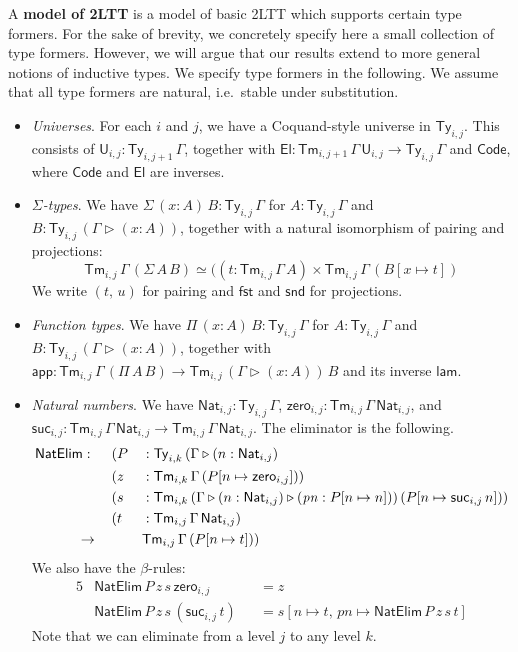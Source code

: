 \documentclass[acmsmall]{acmart}
\newcommand{\mit}[1]{\mathit{#1}}
\newcommand{\msf}[1]{\mathsf{#1}}
\newcommand{\ext}{\triangleright}
\newcommand{\Code}{\msf{Code}}
\newcommand{\El}{\msf{El}}
\newcommand{\lam}{\msf{lam}}
\newcommand{\app}{\msf{app}}
\newcommand{\NatElim}{\msf{NatElim}}
\renewcommand{\U}{\msf{U}}
\newcommand{\Ty}{\msf{Ty}}
\newcommand{\Tm}{\msf{Tm}}
\newcommand{\Nat}{\msf{Nat}}
\newcommand{\zero}{\msf{zero}}
\newcommand{\suc}{\msf{suc}}
\newcommand{\fst}{\msf{fst}}
\newcommand{\snd}{\msf{snd}}
\theoremstyle{remark}
\begin{document}
\begin{definition} A \textbf{model of 2LTT} is a model of basic 2LTT
which supports certain type formers. For the sake of brevity, we concretely
specify here a small collection of type formers. However, we will argue that our
results extend to more general notions of inductive types. We specify type
formers in the following. We assume that all type formers are natural,
i.e.\ stable under substitution.
\begin{itemize}
\item \emph{Universes}. For each $i$ and $j$, we have a Coquand-style universe
  \cite{TODO} in $\Ty_{i,j}$. This consists of $\U_{i,j} : \Ty_{i,j+1}\,\Gamma$,
  together with $\El : \Tm_{i,j+1}\,\Gamma\,\U_{i,j} \to \Ty_{i,j}\,\Gamma$ and $\Code$, where $\Code$
  and $\El$ are inverses.
\item \emph{$\Sigma$-types}. We have $\Sigma\,(x : A)\,B : \Ty_{i,j}\,\Gamma$ for $A : \Ty_{i,j}\,\Gamma$
  and $B : \Ty_{i,j}\,(\Gamma \ext (x : A))$, together with a natural isomorphism of pairing and projections:
  \[ \Tm_{i,j}\,\Gamma\,(\Sigma\,A\,B) \simeq ((t : \Tm_{i,j}\,\Gamma\,A) \times \Tm_{i,j}\,\Gamma\,(B[x\mapsto t]) \]
  We write $(t,\,u)$ for pairing and $\fst$ and $\snd$ for projections.
\item \emph{Function types}. We have $\Pi\,(x : A)\,B : \Ty_{i,j}\,\Gamma$ for $A :
  \Ty_{i,j}\,\Gamma$ and $B : \Ty_{i,j}\,(\Gamma \ext (x : A))$, together with
  $\app : \Tm_{i,j}\,\Gamma\,(\Pi\,A\,B) \to \Tm_{i,j}\,(\Gamma \ext (x :
  A))\,B$ and its inverse $\lam$.
\item \emph{Natural numbers}. We have $\Nat_{i,j} : \Ty_{i,j}\,\Gamma$, $\zero_{i,j} : \Tm_{i,j}\,\Gamma\,\Nat_{i,j}$,
  and $\suc_{i,j} : \Tm_{i,j}\,\Gamma\,\Nat_{i,j} \to \Tm_{i,j}\,\Gamma\,\Nat_{i,j}$. The eliminator is the following.
  \begin{alignat*}{5}
    & \NatElim :\hspace{0.5em}
                &&  (P &&: \Ty_{i,k}\,(\Gamma \ext (n : \Nat_{i,j}) \\
    &           &&  (z &&: \Tm_{i,k}\,\Gamma\,(P[n\mapsto \zero_{i,j}])) \\
    &           &&  (s &&: \Tm_{i,k}\,(\Gamma \ext (n : \Nat_{i,j}) \ext (\mit{pn} : P[n\mapsto n]))\,(P[n\mapsto \suc_{i,j}\,n]))\\
    &           &&  (t &&: \Tm_{i,j}\,\Gamma\,\Nat_{i,j}) \\
    &\hspace{3em}\to        &&&& \Tm_{i,j}\,\Gamma\,(P[n\mapsto t]))
  \end{alignat*}
  We also have the $\beta$-rules:
  \begin{alignat*}{5}
    & \NatElim\,P\,z\,s\,\zero_{i,j}     &&= z \\
    & \NatElim\,P\,z\,s\,(\suc_{i,j}\,t) &&= s[n \mapsto t,\,\mit{pn} \mapsto \NatElim\,P\,z\,s\,t]
  \end{alignat*}
  Note that we can eliminate from a level $j$ to any level $k$.
\end{itemize}
\end{definition}
\end{document}
